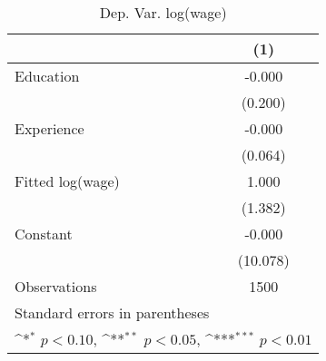 \begin{table}[htbp]\centering
\def\sym#1{\ifmmode^{#1}\else\(^{#1}\)\fi}
\caption{Dep. Var. log(wage) \label{reg2}}
\begin{tabular}{l*{1}{c}}
\toprule
                    &\multicolumn{1}{c}{(1)}         \\
\midrule
Education           &      -0.000         \\
                    &     (0.200)         \\
\addlinespace
Experience          &      -0.000         \\
                    &     (0.064)         \\
\addlinespace
Fitted log(wage)    &       1.000         \\
                    &     (1.382)         \\
\addlinespace
Constant            &      -0.000         \\
                    &    (10.078)         \\
\midrule
Observations        &        1500         \\
\bottomrule
\multicolumn{2}{l}{\footnotesize Standard errors in parentheses}\\
\multicolumn{2}{l}{\footnotesize \sym{*} \(p<0.10\), \sym{**} \(p<0.05\), \sym{***} \(p<0.01\)}\\
\end{tabular}
\end{table}
